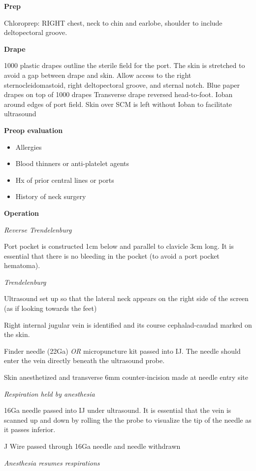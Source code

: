 \documentclass[
  letterpaper,
]{scrbook}
\providecommand{\tightlist}{%
  \setlength{\itemsep}{0pt}\setlength{\parskip}{0pt}}
\begin{document}
\textbf{Prep}

Chloroprep: RIGHT chest, neck to chin and earlobe, shoulder to include
deltopectoral groove.

\textbf{Drape}

1000 plastic drapes outline the sterile field for the port. The skin is
stretched to avoid a gap between drape and skin. Allow access to the
right sternocleidomastoid, right deltopectoral groove, and sternal
notch. Blue paper drapes on top of 1000 drapes Transverse drape reversed
head-to-foot. Ioban around edges of port field. Skin over SCM is left
without Ioban to facilitate ultrasound

\textbf{Preop evaluation}

\begin{itemize}
\tightlist
\item
  Allergies
\item
  Blood thinners or anti-platelet agents
\item
  Hx of prior central lines or ports
\item
  History of neck surgery
\end{itemize}

\textbf{Operation}

\emph{Reverse Trendelenburg}

Port pocket is constructed 1cm below and parallel to clavicle 3cm long.
It is essential that there is no bleeding in the pocket (to avoid a port
pocket hematoma).

\emph{Trendelenburg}

Ultrasound set up so that the lateral neck appears on the right side of
the screen (as if looking towards the feet)

Right internal jugular vein is identified and its course cephalad-caudad
marked on the skin.

Finder needle (22Ga) \emph{OR} micropuncture kit passed into IJ. The
needle should enter the vein directly beneath the ultrasound probe.

Skin anesthetized and transverse 6mm counter-incision made at needle
entry site

\emph{Respiration held by anesthesia}

16Ga needle passed into IJ under ultrasound. It is essential that the
vein is scanned up and down by rolling the the probe to visualize the
tip of the needle as it passes inferior.

J Wire passed through 16Ga needle and needle withdrawn

\emph{Anesthesia resumes respirations}
\end{document}
